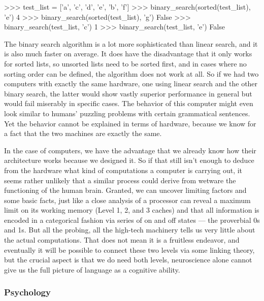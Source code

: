 \begin{center}
\end{center}
\begin{center}
    \begin{pythoncode}
        >>> test_list = ['a', 'c', 'd', 'e', 'b', 'f']
        >>> binary_search(sorted(test_list), 'e')
        4
        >>> binary_search(sorted(test_list), 'g')
        False
        >>> binary_search(test_list, 'c')
        1
        >>> binary_search(test_list, 'e')
        False
    \end{pythoncode}
\end{center}
%
The binary search algorithm is a lot more sophisticated than linear search, and it is also much faster on average.
It does have the disadvantage that it only works for sorted lists, so unsorted lists need to be sorted first, and in cases where no sorting order can be defined, the algorithm does not work at all.
So if we had two computers with exactly the same hardware, one using linear search and the other binary search, the latter would show vastly superior performance in general but would fail miserably in specific cases.
The behavior of this computer might even look similar to humans' puzzling problems with certain grammatical sentences.
Yet the behavior cannot be explained in terms of hardware, because we know for a fact that the two machines are exactly the same.

In the case of computers, we have the advantage that we already know how their architecture works because we designed it.
So if that still isn't enough to deduce from the hardware what kind of computations a computer is carrying out, it seems rather unlikely that a similar process could derive from wetware the functioning of the human brain.
Granted, we can uncover limiting factors and some basic facts, just like a close analysis of a processor can reveal a maximum limit on its working memory (Level 1, 2, and 3 caches) and that all information is encoded in a categorical fashion via series of on and off states --- the proverbial 0s and 1s.
But all the probing, all the high-tech machinery tells us very little about the actual computations.
That does not mean it is a fruitless endeavor, and eventually it will be possible to connect these two levels via some linking theory, but the crucial aspect is that we do need both levels, neuroscience alone cannot give us the full picture of language as a cognitive ability.


\subsubsection{Psychology}

